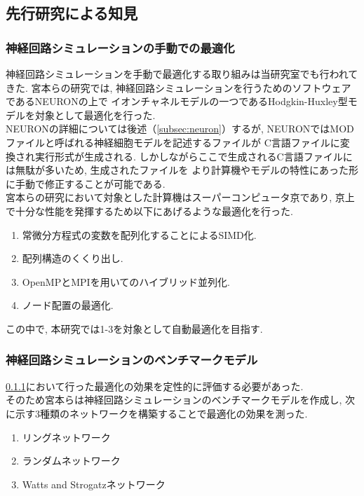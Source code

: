 \subsection{先行研究による知見}
\subsubsection{神経回路シミュレーションの手動での最適化}
\label{sec:section1-1-1}
神経回路シミュレーションを手動で最適化する取り組みは当研究室でも行われてきた.
宮本らの研究\cite{miyamoto-master}では, 神経回路シミュレーションを行うためのソフトウェアであるNEURONの上で
イオンチャネルモデルの一つであるHodgkin-Huxley型モデルを対象として最適化を行った.\\
NEURONの詳細については後述（\ref{subsec:neuron}）するが, NEURONではMODファイルと呼ばれる神経細胞モデルを記述するファイルが
C言語ファイルに変換され実行形式が生成される. しかしながらここで生成されるC言語ファイルには無駄が多いため, 生成されたファイルを
より計算機やモデルの特性にあった形に手動で修正することが可能である.\\
宮本らの研究において対象とした計算機はスーパーコンピュータ京であり, 京上で十分な性能を発揮するため以下にあげるような最適化を行った.\\

\begin{enumerate}
\item 常微分方程式の変数を配列化することによるSIMD化.
\item 配列構造のくくり出し.
\item OpenMPとMPIを用いてのハイブリッド並列化.
\item ノード配置の最適化.
\end{enumerate}
この中で, 本研究では1-3を対象として自動最適化を目指す.\\


\subsubsection{神経回路シミュレーションのベンチマークモデル}
\label{subsec:bench-model}
\ref{sec:section1-1-1}において行った最適化の効果を定性的に評価する必要があった.\\
そのため宮本らは神経回路シミュレーションのベンチマークモデルを作成し,
次に示す3種類のネットワークを構築することで最適化の効果を測った.\\
\begin{enumerate}
\item リングネットワーク
\item ランダムネットワーク
\item Watts and Strogatzネットワーク
\end{enumerate}


